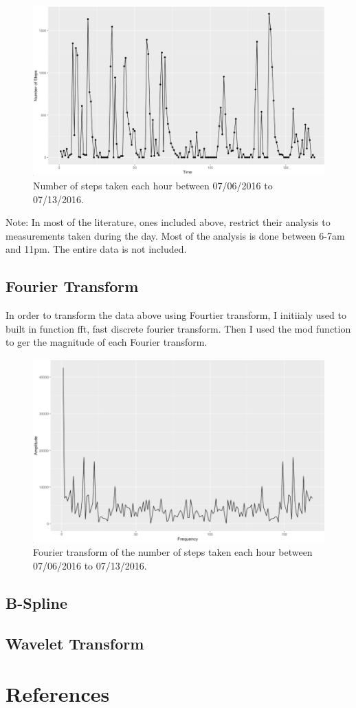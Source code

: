 \documentclass[12pt]{article}
\begin{document}
    \begin{figure}[H]
        \centering
        \includegraphics[scale=0.3]{Number_of_Steps.png}
        \caption{Number of steps taken each hour between 07/06/2016 to 07/13/2016.}
    \end{figure}

    Note: In most of the literature, ones included above, restrict their analysis to measurements taken during
    the day. Most of the analysis is done between 6-7am and 11pm. The entire data is not included.

    \subsection{Fourier Transform}

    In order to transform the data above using Fourtier transform, I initiialy used to built in function fft,
    fast discrete fourier transform. Then I used the mod function to ger the magnitude of each Fourier transform.

    \begin{figure}[H]
        \centering
        \includegraphics[scale=0.3]{images/Number_of _Steps_Fourier.png}
        \caption{Fourier transform of the number of steps taken each hour between 07/06/2016 to 07/13/2016.}
    \end{figure}

    \subsection{B-Spline}

    \subsection{Wavelet Transform}

    \newpage


    \section*{References}
\end{document}
